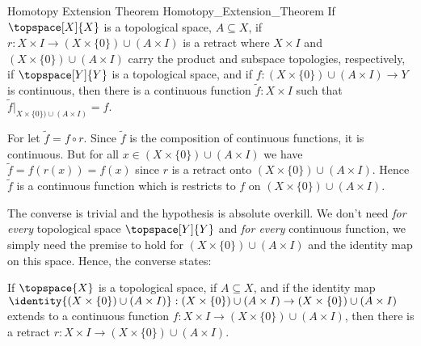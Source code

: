 \documentclass{book}                                                           %
\begin{document}
                \begin{ftheorem}{Homotopy Extension Theorem}
                                {Homotopy_Extension_Theorem}
                    If $\topspace[X]{X}$ is a topological space,
                    $A\subseteq{X}$, if
                    $r:X\times{I}\rightarrow(X\times\{0\})\cup(A\times{I})$ is a
                    retract where $X\times{I}$ and
                    $(X\times\{0\})\cup(A\times{I})$ carry the product and
                    subspace topologies, respectively, if $\topspace[Y]{Y}$ is a
                    topological space, and if
                    $f:(X\times\{0\})\cup(A\times{I})\rightarrow{Y}$ is
                    continuous, then there is a continuous function
                    $\tilde{f}:X\times{I}$ such that
                    $\tilde{f}|_{X\times\{0\})\cup(A\times{I})}=f$.
                \end{ftheorem}
                \begin{bproof}
                    For let $\tilde{f}=f\circ{r}$. Since $\tilde{f}$ is the
                    composition of continuous functions, it is continuous. But
                    for all $x\in(X\times\{0\})\cup(A\times{I})$ we have
                    $\tilde{f}=f(r(x))=f(x)$ since $r$ is a retract onto
                    $(X\times\{0\})\cup(A\times{I})$. Hence $\tilde{f}$ is a
                    continuous function which is restricts to $f$ on
                    $(X\times\{0\})\cup(A\times{I})$.
                \end{bproof}
                The converse is trivial and the hypothesis is absolute overkill.
                We don't need \textit{for every} topological space
                $\topspace[Y]{Y}$ and \textit{for every} continuous function, we
                simply need the premise to hold for
                $(X\times\{0\})\cup(A\times{I})$ and the identity map on this
                space. Hence, the converse states:
                \begin{theorem}
                    If $\topspace{X}$ is a topological space, if
                    $A\subseteq{X}$, and if the identity map
                    $\identity{(X\times\{0\})\cup(A\times{I})}:%
                    (X\times\{0\})\cup(A\times{I})\rightarrow%
                    (X\times\{0\})\cup(A\times{I})$ extends to a continuous
                    function
                    $f:X\times{I}\rightarrow(X\times\{0\})\cup(A\times{I})$,
                    then there is a retract
                    $r:X\times{I}\rightarrow(X\times\{0\})\cup(A\times{I})$.
                \end{theorem}
\end{document}
